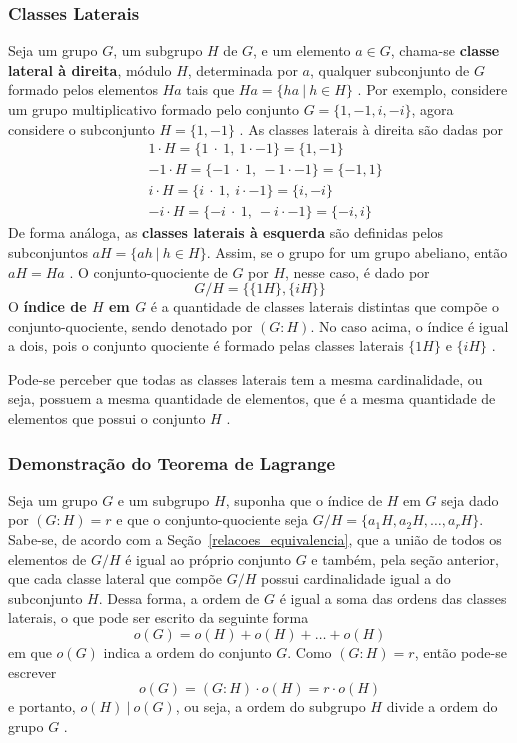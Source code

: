 \subsubsection{Classes Laterais}
Seja um grupo \(G\), um subgrupo \(H\) de \(G\), e um elemento \(a \in G\), chama-se \textbf{classe lateral à direita}, módulo \(H\), determinada por \(a\), qualquer subconjunto de \(G\) formado pelos elementos \(Ha\) tais que \(Ha = \{ha\ |\  h \in H\}\) \cite{Gilbert:2004}. Por exemplo, considere um grupo multiplicativo formado pelo conjunto \(G = \{1, -1, i, -i\}\), agora considere o subconjunto \(H = \{1, -1\}\) \cite{Domingues:2003}. As classes laterais à direita são dadas por
\begin{align*}
  &1\cdot H = \{1\ \cdot\ 1,\ 1 \cdot -1\} = \{1, -1\} \\
  &-1\cdot H = \{-1\ \cdot\ 1,\ -1 \cdot -1\} = \{-1, 1\} \\
  &i\cdot H = \{i\ \cdot\ 1,\ i \cdot -1\} = \{i, -i\} \\
  &-i\cdot H = \{-i\ \cdot\ 1,\ -i \cdot -1\} = \{-i, i\}
\end{align*}
De forma análoga, as \textbf{classes laterais à esquerda} são definidas pelos subconjuntos \(aH = \{ah\ |\ h \in H\}\). Assim, se o grupo for um grupo abeliano, então \(aH = Ha\) \cite{Domingues:2003}.
O conjunto-quociente de \(G\) por \(H\), nesse caso, é dado por
$$
  G / H = \{\{1H\}, \{iH\}\}
$$
O \textbf{índice de \(H\) em \(G\)} é a quantidade de classes laterais distintas que compõe o conjunto-quociente, sendo denotado por \((G : H)\). No caso acima, o índice é igual a dois, pois o conjunto quociente é formado pelas classes laterais \(\{1H\}\) e \(\{iH\}\) \cite{Domingues:2003}.

Pode-se perceber que todas as classes laterais tem a mesma cardinalidade, ou seja, possuem a mesma quantidade de elementos, que é a mesma quantidade de elementos que possui o conjunto \(H\) \cite{Shoup:2005}.

%
%
\subsubsection{Demonstração do Teorema de Lagrange}
Seja um grupo \(G\) e um subgrupo \(H\), suponha que o índice de \(H\) em \(G\) seja dado por \((G : H) = r\) e que o conjunto-quociente seja \(G / H = \{a_1H, a_2H, \ldots, a_rH\}\). Sabe-se, de acordo com a Seção~\ref{relacoes_equivalencia}, que a união de todos os elementos de \(G/H\) é igual ao próprio conjunto \(G\) e também, pela seção anterior, que cada classe lateral que compõe \(G/H\) possui cardinalidade igual a do subconjunto \(H\). Dessa forma, a ordem de \(G\) é igual a soma das ordens das classes laterais, o que pode ser escrito da seguinte forma
$$
  o(G) = o(H) + o(H) + \ldots + o(H)
$$
em que \(o(G)\) indica a ordem do conjunto \(G\). Como \((G : H) = r\), então pode-se escrever
$$
  o(G) = (G : H)\cdot o(H) = r\cdot o(H)
$$
e portanto, \(o(H)\ |\ o(G)\), ou seja, a ordem do subgrupo \(H\) divide a ordem do grupo \(G\) \cite{Domingues:2003}.
%
%
